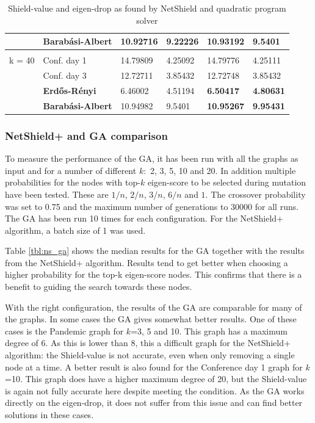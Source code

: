 \documentclass[11pt]{article}
\theoremstyle{definition}
\begin{document}
\begin{table}
\begin{center}
\begin{tabular}{ | l | l | l | l | l | l |}
                & \textbf{Barab\'asi-Albert} & 10.92716 & 9.22226 & \textbf{10.93192} & \textbf{9.5401} \\ \hline
                & & & & & \\ \hline
                k = 40 & Conf. day 1 & 14.79809 & 4.25092 & 14.79776 & 4.25111 \\ \hline
                & Conf. day 3 & 12.72711 & 3.85432 & 12.72748 & 3.85432 \\ \hline
                & \textbf{Erd\H{o}s-R\'enyi} & 6.46002 & 4.51194 & \textbf{6.50417} & \textbf{4.80631} \\ \hline
                & \textbf{Barab\'asi-Albert} & 10.94982 & 9.5401 & \textbf{10.95267} & \textbf{9.95431} \\ \hline
        \end{tabular}
        \caption{Shield-value and eigen-drop as found by NetShield and quadratic program solver}
        \label{tbl:ns_qp}
\end{center}
\end{table}

\subsubsection{NetShield+ and GA comparison}

To measure the performance of the GA, it has been run with all the graphs as input and for a number of different $k:$ 2, 3, 5, 10 and 20. In addition multiple probabilities for the nodes with top-$k$ eigen-score to be selected during mutation have been tested. These are $1/n$, $2/n$, $3/n$, $6/n$ and $1$. The crossover probability was set to 0.75 and the maximum number of generations to 30000 for all runs. The GA has been run 10 times for each configuration. For the NetShield+ algorithm, a batch size of 1 was used.

Table \ref{tbl:ns_ga} shows the median results for the GA together with the results from the NetShield+ algorithm. Results tend to get better when choosing a higher probability for the top-k eigen-score nodes. This confirms that there is a benefit to guiding the search towards these nodes.

With the right configuration, the results of the GA are comparable for many of the graphs. In some cases the GA gives somewhat better results. One of these cases is the Pandemic graph for $k$=3, 5 and 10. This graph has a maximum degree of 6. As this is lower than 8, this a difficult graph for the NetShield+ algorithm: the Shield-value is not accurate, even when only removing a single node at a time. A better result is also found for the Conference day 1 graph for $k$=10. This graph does have a higher maximum degree of 20, but the Shield-value is again not fully accurate here despite meeting the condition. As the GA works directly on the eigen-drop, it does not suffer from this issue and can find better solutions in these cases.
\end{document}

